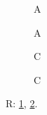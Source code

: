 \documentclass{article}
\begin{document}
\begin{figure}A\caption{A}\end{figure}
\begin{figure}\begin{minipage}{.8\linewidth}\label{lst}\end{minipage}\end{figure}
\begin{figure}C\caption{C}\label{fc}\end{figure}
R: \ref{lst}, \ref{fc}.
\end{document}
